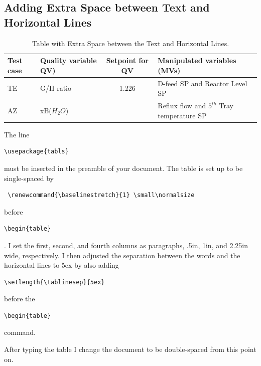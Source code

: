 \subsection{Adding Extra Space between Text and Horizontal Lines}

\renewcommand{\baselinestretch}{1}
\small\normalsize

\setlength{\tablinesep}{5ex}

\begin{table}[h]
\caption{Table with Extra Space between the Text and Horizontal Lines.}
\begin{center}
\begin{tabular}{|p{.5in}|p{1in}|c|p{2.25in}|}
\hline
Test case& Quality variable QV)& Setpoint for QV & Manipulated  variables (MVs)\\
\hline \hline
TE & G/H ratio & 1.226 & D-feed SP and Reactor Level SP\\ \hline
AZ & xB($H_2O$) & & Reflux flow and $5^{th}$ Tray temperature SP \\
\hline
\end{tabular}
\end{center}
\label{test_over}
\end{table}

\renewcommand{\baselinestretch}{2}
\small\normalsize

The line \begin{verbatim}\usepackage{tabls}\end{verbatim} must be inserted in the preamble of your document.
The table is set up to be single-spaced by \begin{verbatim} \renewcommand{\baselinestretch}{1} \small\normalsize\end{verbatim} before \begin{verbatim}\begin{table}\end{verbatim}.  I set the first, second, and fourth columns as paragraphs, .5in, 1in, and 2.25in wide, respectively.  I then adjusted the separation between the words and the horizontal lines to 5ex by also adding \begin{verbatim}\setlength{\tablinesep}{5ex}\end{verbatim} before the \begin{verbatim}\begin{table}\end{verbatim} command.

After typing the table I change the document to be double-spaced from this point on.

